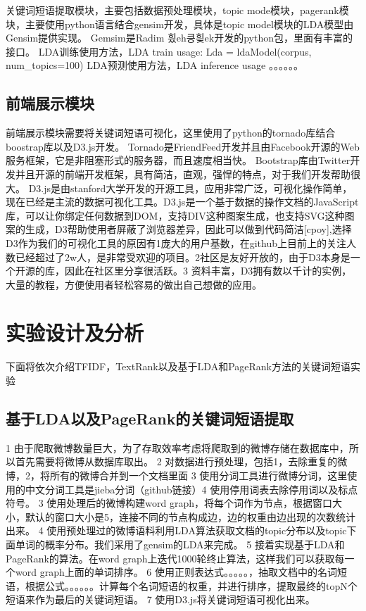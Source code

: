 \documentclass[master]{njuthesis}
\begin{document}
    关键词短语提取模块，主要包括数据预处理模块，topic mode模块，pagerank模块，主要使用python语言结合gensim开发，具体是topic model模块的LDA模型由Gensim提供实现。
    Gemsim是Radim 힀eh킁힂ek开发的python包，里面有丰富的接口。
    LDA训练使用方法，LDA train usage: Lda = ldaModel(corpus, num\_topics=100)
    LDA预测使用方法，LDA inference usage 。。。。。。

\subsection{前端展示模块}
    
    前端展示模块需要将关键词短语可视化，这里使用了python的tornado库结合boostrap库以及D3.js开发。
    Tornado是FriendFeed开发并且由Facebook开源的Web服务框架，它是非阻塞形式的服务器，而且速度相当快。
    Bootstrap库由Twitter开发并且开源的前端开发框架，具有简洁，直观，强悍的特点，对于我们开发帮助很大。
    D3.js是由stanford大学开发的开源工具，应用非常广泛，可视化操作简单，现在已经是主流的数据可视化工具。D3.js是一个基于数据的操作文档的JavaScript库，可以让你绑定任何数据到DOM，支持DIV这种图案生成，也支持SVG这种图案的生成，D3帮助使用者屏蔽了浏览器差异，因此可以做到代码简洁[cpoy],选择D3作为我们的可视化工具的原因有1庞大的用户基数，在github上目前上的关注人数已经超过了2w人，是非常受欢迎的项目。2社区是友好开放的，由于D3本身是一个开源的库，因此在社区里分享很活跃。3 资料丰富，D3拥有数以千计的实例，大量的教程，方便使用者轻松容易的做出自己想做的应用。


\section{实验设计及分析}

    下面将依次介绍TFIDF，TextRank以及基于LDA和PageRank方法的关键词短语实验

\subsection{基于LDA以及PageRank的关键词短语提取}

    1 由于爬取微博数量巨大，为了存取效率考虑将爬取到的微博存储在数据库中，所以首先需要将微博从数据库取出。
    2 对数据进行预处理，包括1，去除重复的微博，2，将所有的微博合并到一个文档里面 3 使用分词工具进行微博分词，这里使用的中文分词工具是jieba分词（github链接）4 使用停用词表去除停用词以及标点符号。
    3 使用处理后的微博构建word graph，将每个词作为节点，根据窗口大小，默认的窗口大小是5，连接不同的节点构成边，边的权重由边出现的次数统计出来。
    4 使用预处理过的微博语料利用LDA算法获取文档的topic分布以及topic下面单词的概率分布。我们采用了gensim的LDA来完成。
    5 接着实现基于LDA和PageRank的算法。在word graph上迭代1000轮终止算法，这样我们可以获取每一个word graph上面的单词排序。
    6 使用正则表达式。。。。。，抽取文档中的名词短语，根据公式。。。。。。计算每个名词短语的权重，并进行排序，提取最终的topN个短语来作为最后的关键词短语。
    7 使用D3.js将关键词短语可视化出来。
\end{document}

